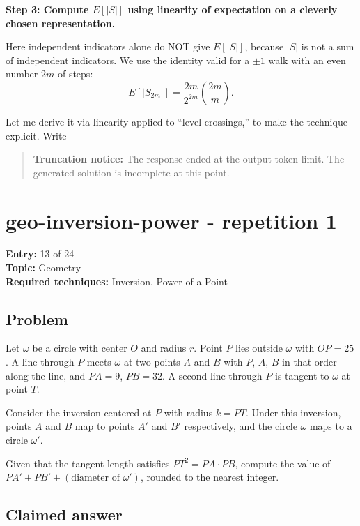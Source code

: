 \documentclass[
  11pt,
  letterpaper,
]{article}
\begin{document}
\textbf{Step 3: Compute \(E[|S|]\) using linearity of expectation on a
cleverly chosen representation.}

Here independent indicators alone do NOT give \(E[|S|]\), because
\(|S|\) is not a sum of independent indicators. We use the identity
valid for a \(\pm1\) walk with an even number \(2m\) of steps:
\[E[|S_{2m}|]=\frac{2m}{2^{2m}}\binom{2m}{m}.\]

Let me derive it via linearity applied to ``level crossings,'' to make
the technique explicit. Write

\begin{quote}
\textbf{Truncation notice:} The response ended at the output-token
limit. The generated solution is incomplete at this point.
\end{quote}

\clearpage

\section{geo-inversion-power - repetition
1}\label{geo-inversion-power---repetition-1}

\textbf{Entry:} 13 of 24\\
\textbf{Topic:} Geometry\\
\textbf{Required techniques:} Inversion, Power of a Point

\subsection{Problem}\label{problem-12}

Let \(\omega\) be a circle with center \(O\) and radius \(r\). Point
\(P\) lies outside \(\omega\) with \(OP = 25\). A line through \(P\)
meets \(\omega\) at two points \(A\) and \(B\) with \(P\), \(A\), \(B\)
in that order along the line, and \(PA = 9\), \(PB = 32\). A second line
through \(P\) is tangent to \(\omega\) at point \(T\).

Consider the inversion centered at \(P\) with radius \(k = PT\). Under
this inversion, points \(A\) and \(B\) map to points \(A'\) and \(B'\)
respectively, and the circle \(\omega\) maps to a circle \(\omega'\).

Given that the tangent length satisfies \(PT^2 = PA \cdot PB\), compute
the value of \(PA' + PB' + (\text{diameter of } \omega')\), rounded to
the nearest integer.

\subsection{Claimed answer}\label{claimed-answer-12}
\end{document}
